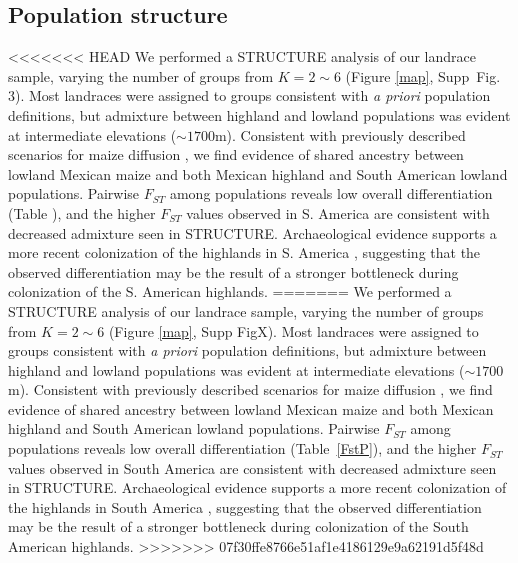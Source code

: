 \subsection*{Population structure}

<<<<<<< HEAD
We performed a {\sf STRUCTURE} analysis \cite[]{Pritchard_2000_10835412,Falush_2003_12930761} of our landrace sample, varying the number of groups from $K=2\sim 6$ (Figure \ref{map}, Supp~Fig. 3). 
Most landraces were assigned to groups consistent with \emph{a priori} population definitions, but admixture between highland and lowland populations was evident at intermediate elevations ($\sim1700$m).  Consistent with previously described scenarios for maize diffusion \cite[]{Piperno_2006_69}, we find evidence of shared ancestry between lowland Mexican maize and both Mexican highland and South American lowland populations.  Pairwise $F_{ST}$ among populations reveals low overall differentiation (Table \label{FstP}), and the higher $F_{ST}$ values observed in S. America are consistent with decreased admixture seen in STRUCTURE.  Archaeological evidence supports a more recent colonization of the highlands in S. America  \cite[]{Piperno_2006_69,Perry_2006_16511492,Grobman_2012_22307642}, suggesting that the observed differentiation may be the result of a stronger  bottleneck during colonization of the S. American highlands. 
=======
We performed a {\sf STRUCTURE} analysis \citep{Pritchard_2000_10835412,Falush_2003_12930761} of our landrace sample, varying the number of groups from $K=2\sim 6$ (Figure \ref{map}, Supp FigX). 
Most landraces were assigned to groups consistent with \emph{a priori} population definitions, but admixture between highland and lowland populations was evident at intermediate elevations ($\sim1700$m).  Consistent with previously described scenarios for maize diffusion \citep{Piperno_2006_69}, we find evidence of shared ancestry between lowland Mexican maize and both Mexican highland and South American lowland populations.  Pairwise $F_{ST}$ among populations reveals low overall differentiation (Table~\ref{FstP}), and the higher $F_{ST}$ values observed in South America are consistent with decreased admixture seen in STRUCTURE.  Archaeological evidence supports a more recent colonization of the highlands in South America  \citep{Piperno_2006_69,Perry_2006_16511492,Grobman_2012_22307642}, suggesting that the observed differentiation may be the result of a stronger  bottleneck during colonization of the South American highlands. 
>>>>>>> 07f30ffe8766e51af1e4186129e9a62191d5f48d

